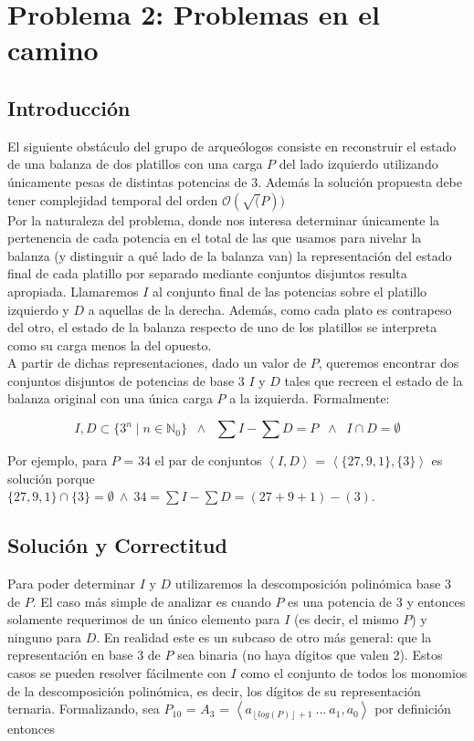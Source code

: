 \newpage
\section{Problema 2: Problemas en el camino}

\subsection{Introducción}
	El siguiente obstáculo del grupo de arqueólogos consiste en reconstruir el estado de una balanza de dos platillos con una carga $P$ del lado izquierdo utilizando únicamente pesas de distintas potencias de 3. Además la solución propuesta debe tener complejidad temporal del orden $\mathcal{O}(\sqrt(P))$
	\\

	Por la naturaleza del problema, donde nos interesa determinar únicamente la pertenencia de cada potencia en el total de las que usamos para nivelar la balanza (y distinguir a qué lado de la balanza van) la representación del estado final de cada platillo por separado mediante conjuntos disjuntos resulta apropiada. Llamaremos $I$ al conjunto final de las potencias sobre el platillo izquierdo y $D$ a aquellas de la derecha. Además, como cada plato es contrapeso del otro, el estado de la balanza respecto de uno de los platillos se interpreta como su carga menos la del opuesto.
	\\

	A partir de dichas representaciones, dado un valor de $P$, queremos encontrar dos conjuntos disjuntos de potencias de base 3 $I$ y $D$ tales que recreen el estado de la balanza original con una única carga $P$ a la izquierda. Formalmente:

$$
    I,D \subset \{3^n \;|\; n \in \mathbb{N}_0 \} \;\; \land \;\;
    \sum I - \sum D = P \;\; \land \;\;
    I \cap D = \emptyset
$$

	Por ejemplo, para $P$ = 34 el par de conjuntos $\left \langle I,D  \right \rangle$ = $\left \langle \{27,9,1\},\{3\}  \right \rangle$ es solución porque \\
	$\{27,9,1\} \cap \{3\} = \emptyset \ \wedge \ 34 = \sum I - \sum D = (27+9+1)-(3)$.
	\\



\subsection{Solución y Correctitud}
	Para poder determinar $I$ y $D$ utilizaremos la descomposición polinómica base 3 de $P$. El caso más simple de analizar es cuando $P$ es una potencia de 3 y entonces solamente requerimos de un único elemento para $I$ (es decir, el mismo $P$) y ninguno para $D$. En realidad este es un subcaso de otro más general: que la representación en base 3 de $P$ sea binaria (no haya dígitos que valen 2). Estos casos se pueden resolver fácilmente con $I$ como el conjunto de todos los monomios de la descomposición polinómica, es decir, los dígitos de su representación ternaria. Formalizando, sea $P_{10}$ = $A_3$ = $\left \langle a_{ \left \lfloor{log(P)}\right \rfloor + 1 } \ ... \ a_1, a_0  \right \rangle$ por definición entonces \\

